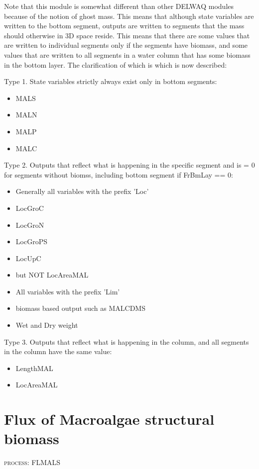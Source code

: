 \documentclass{deltares_manual}
\begin{document}
Note that this module is somewhat different than other DELWAQ modules because of the notion of ghost mass. This means that although state variables are written to the bottom segment, outputs are written to segments that the mass should otherwise in 3D space reside. This means that there are some values that are written to individual segments only if the segments have biomass, and some values that are written to all segments in a water column that has some biomass in the bottom layer. The clarification of which is which is now described:
 
Type 1. State variables strictly always exist only in bottom segments:
\begin{itemize}
	\item MALS
	\item MALN
	\item MALP
	\item MALC
\end{itemize}

Type 2. Outputs that reflect what is happening in the specific segment and is = 0 for segments without biomss, including bottom segment if FrBmLay == 0:
\begin{itemize}
	\item Generally all variables with the prefix 'Loc'
	\item LocGroC
	\item LocGroN
	\item LocGroPS
	\item LocUpC
	\item but NOT LocAreaMAL
	\item All variables with the prefix 'Lim'
	\item biomass based output such as MALCDMS
	\item Wet and Dry weight
\end{itemize}

Type 3. Outputs that reflect what is happening in the column, and all segments in the column have the same value:
\begin{itemize}
	\item LengthMAL
	\item LocAreaMAL
\end{itemize}


\pagebreak

\section{Flux of Macroalgae structural biomass}
\begin{flushright}
\textsc{process: FLMALS}
\end{flushright}
\end{document}
